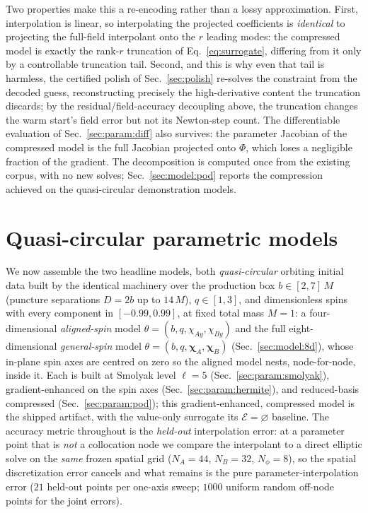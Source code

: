 \documentclass[
  aps,
  prd,
  twocolumn,
  amsmath,
  amssymb,
  nofootinbib,
  superscriptaddress,
  floatfix,
]{revtex4-2}
\begin{document}
Two properties make this a re-encoding rather than a lossy approximation. First,
interpolation is linear, so interpolating the projected coefficients is
\emph{identical} to projecting the full-field interpolant onto the $r$ leading
modes: the compressed model is exactly the rank-$r$ truncation of
Eq.~\eqref{eq:surrogate}, differing from it only by a controllable truncation tail.
Second, and this is why even that tail is harmless, the certified polish of
Sec.~\ref{sec:polish} re-solves the constraint from the decoded guess,
reconstructing precisely the high-derivative content the truncation discards; by the
residual/field-accuracy decoupling above, the truncation changes the warm start's
field error but not its Newton-step count. The differentiable evaluation of
Sec.~\ref{sec:param:diff} also survives: the parameter Jacobian of the compressed
model is the full Jacobian projected onto $\Phi$, which loses a negligible fraction
of the gradient. The decomposition is computed once from the existing corpus, with no
new solves; Sec.~\ref{sec:model:pod} reports the compression achieved on the quasi-circular demonstration
models.


\section{Quasi-circular parametric models}
\label{sec:model}
We now assemble the two headline models, both \emph{quasi-circular} orbiting
initial data built by the identical machinery over the production box
$b\in[2,7]\,M$ (puncture separations $D=2b$ up to $14\,M$), $q\in[1,3]$, and
dimensionless spins with every component in $[-0.99,0.99]$, at fixed total mass
$M=1$: a four-dimensional \emph{aligned-spin} model
$\theta=(b,q,\chi_{Ay},\chi_{By})$ and the full eight-dimensional
\emph{general-spin} model $\theta=(b,q,\boldsymbol{\chi}_A,\boldsymbol{\chi}_B)$
(Sec.~\ref{sec:model:8d}), whose in-plane spin axes are centred on zero so the
aligned model nests, node-for-node, inside it. Each is built at Smolyak level
$\ell=5$ (Sec.~\ref{sec:param:smolyak}), gradient-enhanced on the spin axes
(Sec.~\ref{sec:param:hermite}), and reduced-basis compressed
(Sec.~\ref{sec:param:pod}); this gradient-enhanced, compressed model is the shipped
artifact, with the value-only surrogate its $\mathcal{E}=\varnothing$ baseline. The
accuracy metric throughout is the \emph{held-out}
interpolation error: at a parameter point that is \emph{not} a collocation node we
compare the interpolant to a direct elliptic solve on the \emph{same} frozen
spatial grid ($N_A=44$, $N_B=32$, $N_\phi=8$), so the spatial discretization error
cancels and what remains is the pure parameter-interpolation error ($21$
held-out points per one-axis sweep; $1000$ uniform random off-node points for the
joint errors).
\end{document}
